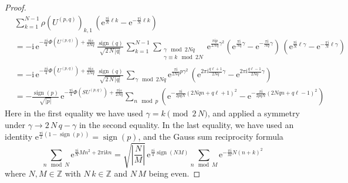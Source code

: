 \documentclass[12pt,reqno]{amsart}
\numberwithin{equation}{section}
\DeclareMathOperator{\sign}{sign}
\begin{document}
\begin{proof}
  \begin{align*}
    & \sum_{k=1}^{N-1}
    \rho(U^{(p,q)})_{k,1} \,
    \left(
      \mathrm{e}^{\frac{\pi \mathrm{i}}{N} \ell k}
      -
      \mathrm{e}^{ -\frac{\pi \mathrm{i}}{N} \ell k}
    \right)
    \\
    & =
    -\mathrm{i} \,
    \mathrm{e}^{-\frac{\pi \mathrm{i}}{4} \Phi(U^{(p,q)})
      +
      \frac{\pi \mathrm{i} s}{2 N q}}
    \,
    \frac{\sign(q)}{\sqrt{2 \, N \, | q|}} \,
    \sum_{k=1}^{N-1}
    \sum_{
      \substack{
        \gamma \mod 2 N q \\
        \gamma \equiv k \mod 2 N}}
    \mathrm{e}^{\frac{ \pi \mathrm{i} p}{2 N q} \gamma^2}
    \left(
      \mathrm{e}^{\frac{\pi \mathrm{i}}{N q} \gamma}
      -
      \mathrm{e}^{ -\frac{\pi \mathrm{i}}{N q} \gamma}
    \right) \,
    \left(
      \mathrm{e}^{\frac{\pi \mathrm{i}}{N} \ell \gamma}
      -
      \mathrm{e}^{ -\frac{\pi \mathrm{i}}{N} \ell \gamma}
    \right)       
    \\
    & =
    -\mathrm{i} \,
    \mathrm{e}^{-\frac{\pi \mathrm{i}}{4} \Phi(U^{(p,q)})
      +
      \frac{\pi \mathrm{i} s}{2 N q}
    }
    \,
    \frac{\sign(q)}{\sqrt{2 \, N \, | q|}} \,
    \sum_{\gamma \mod 2 N q}
    \mathrm{e}^{\frac{\pi \mathrm{i}}{2 N q} p \gamma^2} \,
    \left(
      \mathrm{e}^{2 \pi \mathrm{i} \frac{q \ell +1 }{2 N q}  \gamma}
      -
      \mathrm{e}^{2 \pi \mathrm{i} \frac{q \ell -1 }{2 N q}  \gamma}
    \right)
    \\
    & =
    -\frac{\sign(p)}{\sqrt{|p|}} \,
    \mathrm{e}^{
      -\frac{\pi \mathrm{i}}{4} 
      \Phi(S U^{(p,q)})
      +
      \frac{\pi \mathrm{i} s}{2 N q}
    }
    \sum_{n \mod p}
    \left(
      \mathrm{e}^{-\frac{\pi \mathrm{i}}{2 p q N}
        (2 N q n + q \ell+1)^2
      }
      -
      \mathrm{e}^{-\frac{\pi \mathrm{i}}{2 p q N}
        (2 N q n + q \ell-1)^2
      }
    \right)
  \end{align*}
  Here in the first equality we have used
  $\gamma=k \pmod{ 2 \, N}$, and applied a symmetry under
  $\gamma \to 2 \, N \, q- \gamma$ in the second equality.
  In the last equality, we have used
  an identity
  $\mathrm{e}^{\frac{\pi \mathrm{i}}{2} (1-\sign(p))}
  =
  \sign(p)
  $,
  and the Gauss sum reciprocity formula~\cite{LCJeff92a}
  \begin{equation}
    \label{Gauss_sum_formula}
    \sum_{n \mod N}
    \mathrm{e}^{\frac{\pi \mathrm{i}}{N} M n^2 + 2 \pi \mathrm{i} k n}
    =
    \sqrt{
      \left|
        \frac{N}{M}
      \right|
    } \,
    \mathrm{e}^{\frac{\pi \mathrm{i}}{4} \sign(N M)}
    \sum_{n \mod M}
    \mathrm{e}^{
      -\frac{\pi \mathrm{i}}{M}
      N (n+k)^2
    }
  \end{equation}
  where $N, M\in \mathbb{Z}$
  with
  $N \, k \in \mathbb{Z}$ and
  $N \, M$ being even.


\end{proof}
\end{document}
